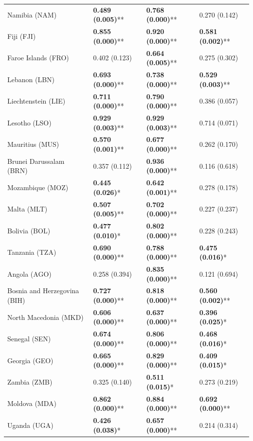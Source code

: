 \begin{longtable}{p{4cm}p{3cm}p{3cm}p{3cm}}
Namibia (NAM) & \textbf{0.489 (0.005)}** & \textbf{0.768 (0.000)}** & 0.270 (0.142) \\
Fiji (FJI) & \textbf{0.855 (0.000)}** & \textbf{0.920 (0.000)}** & \textbf{0.581 (0.002)}** \\
Faroe Islands (FRO) & 0.402 (0.123) & \textbf{0.664 (0.005)}** & 0.275 (0.302) \\
Lebanon (LBN) & \textbf{0.693 (0.000)}** & \textbf{0.738 (0.000)}** & \textbf{0.529 (0.003)}** \\
Liechtenstein (LIE) & \textbf{0.711 (0.000)}** & \textbf{0.790 (0.000)}** & 0.386 (0.057) \\
Lesotho (LSO) & \textbf{0.929 (0.003)}** & \textbf{0.929 (0.003)}** & 0.714 (0.071) \\
Mauritius (MUS) & \textbf{0.570 (0.001)}** & \textbf{0.677 (0.000)}** & 0.262 (0.170) \\
Brunei Darussalam (BRN) & 0.357 (0.112) & \textbf{0.936 (0.000)}** & 0.116 (0.618) \\
Mozambique (MOZ) & \textbf{0.445 (0.026)}* & \textbf{0.642 (0.001)}** & 0.278 (0.178) \\
Malta (MLT) & \textbf{0.507 (0.005)}** & \textbf{0.702 (0.000)}** & 0.227 (0.237) \\
Bolivia (BOL) & \textbf{0.477 (0.010)}* & \textbf{0.802 (0.000)}** & 0.228 (0.243) \\
Tanzania (TZA) & \textbf{0.690 (0.000)}** & \textbf{0.788 (0.000)}** & \textbf{0.475 (0.016)}* \\
Angola (AGO) & 0.258 (0.394) & \textbf{0.835 (0.000)}** & 0.121 (0.694) \\
Bosnia and Herzegovina (BIH) & \textbf{0.727 (0.000)}** & \textbf{0.818 (0.000)}** & \textbf{0.560 (0.002)}** \\
North Macedonia (MKD) & \textbf{0.606 (0.000)}** & \textbf{0.637 (0.000)}** & \textbf{0.396 (0.025)}* \\
Senegal (SEN) & \textbf{0.674 (0.000)}** & \textbf{0.806 (0.000)}** & \textbf{0.468 (0.016)}* \\
Georgia (GEO) & \textbf{0.665 (0.000)}** & \textbf{0.829 (0.000)}** & \textbf{0.409 (0.015)}* \\
Zambia (ZMB) & 0.325 (0.140) & \textbf{0.511 (0.015)}* & 0.273 (0.219) \\
Moldova (MDA) & \textbf{0.862 (0.000)}** & \textbf{0.884 (0.000)}** & \textbf{0.692 (0.000)}** \\
Uganda (UGA) & \textbf{0.426 (0.038)}* & \textbf{0.657 (0.000)}** & 0.214 (0.314) \\

\end{longtable}
